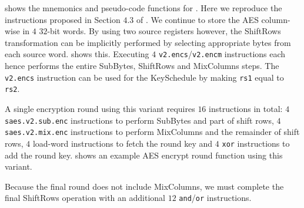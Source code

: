 
 shows the mnemonics and pseudo-code functions
for .
Here we reproduce the instructions proposed in Section $4.3$ of
\cite{TilGro:06}.
We continue to store the AES column-wise in $4$ $32$-bit words.
By using two source registers however,
the ShiftRows transformation can be implicitly performed by selecting
appropriate bytes from each source word.
shows this.
Executing $4$  {\tt v2.encs}/{\tt v2.encm} instructions each hence
performs the entire SubBytes, ShiftRows and MixColumns steps.
The {\tt v2.encs} instruction can be used for the KeySchedule by
making {\tt rs1} equal to {\tt rs2}.

A single encryption round using this variant requires $16$ instructions
in total:
$4$ {\tt saes.v2.sub.enc} instructions to perform SubBytes and part of
shift rows,
$4$ {\tt saes.v2.mix.enc} instructions to perform MixColumns and the
remainder of shift rows,
$4$ load-word instructions to fetch the round key
and
$4$ {\tt xor} instructions to add the round key.
 shows an example AES encrypt round function
using this variant.

Because the final round does not include MixColumns, we must
complete the final ShiftRows operation with an additional
$12$ {\tt and}/{\tt or} instructions.

